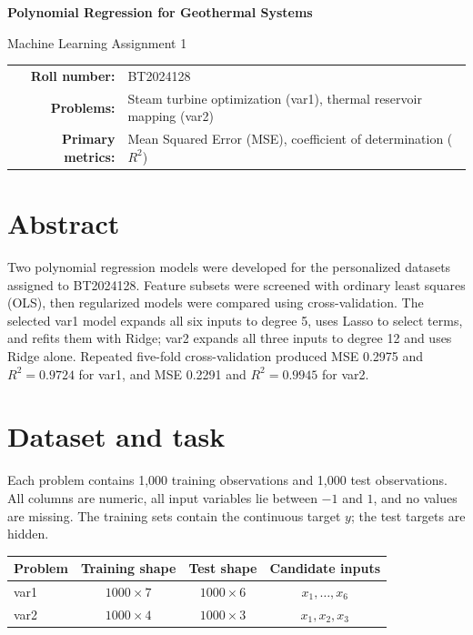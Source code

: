 \documentclass[10pt,a4paper]{article}
\begin{document}
\begin{center}
{\LARGE\bfseries Polynomial Regression for Geothermal Systems}\par\vspace{6pt}
{\large Machine Learning Assignment 1}\par\vspace{10pt}
\begin{tabular}{rl}
\textbf{Roll number:} & BT2024128 \\
\textbf{Problems:} & Steam turbine optimization (var1), thermal reservoir mapping (var2) \\
\textbf{Primary metrics:} & Mean Squared Error (MSE), coefficient of determination ($R^2$)
\end{tabular}
\par{}
\end{center}

\section*{Abstract}
Two polynomial regression models were developed for the personalized datasets assigned to BT2024128. Feature subsets were screened with ordinary least squares (OLS), then regularized models were compared using cross-validation. The selected var1 model expands all six inputs to degree 5, uses Lasso to select terms, and refits them with Ridge; var2 expands all three inputs to degree 12 and uses Ridge alone. Repeated five-fold cross-validation produced MSE 0.2975 and $R^2=0.9724$ for var1, and MSE 0.2291 and $R^2=0.9945$ for var2.

\section{Dataset and task}
Each problem contains 1,000 training observations and 1,000 test observations. All columns are numeric, all input variables lie between $-1$ and $1$, and no values are missing. The training sets contain the continuous target $y$; the test targets are hidden.

\begin{table}[h]
\centering
{}
\begin{tabular}{lccc}
\toprule
Problem & Training shape & Test shape & Candidate inputs \\
\midrule
var1 & $1000 \times 7$ & $1000 \times 6$ & $x_1,\ldots,x_6$ \\
var2 & $1000 \times 4$ & $1000 \times 3$ & $x_1,x_2,x_3$ \\
\bottomrule
\end{tabular}
\end{table}
\end{document}
